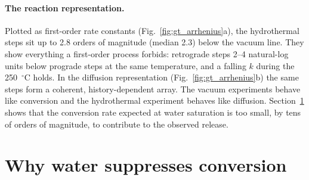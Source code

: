 \paragraph{The reaction representation.} Plotted as first-order rate constants
(Fig.~\ref{fig:gt_arrhenius}a), the hydrothermal steps sit up to 2.8 orders of magnitude
(median 2.3) below the vacuum line. They show everything a first-order process forbids:
retrograde steps 2--4 natural-log units below prograde steps at the same temperature, and a
falling $k$ during the 250~$^\circ$C holds. In the diffusion representation
(Fig.~\ref{fig:gt_arrhenius}b) the same steps form a coherent, history-dependent array. The vacuum
experiments behave like conversion and the hydrothermal experiment behaves like diffusion.
Section~\ref{sec:gt_nucleation} shows that the conversion rate expected at water saturation is too
small, by tens of orders of magnitude, to contribute to the observed release.


\section{Why water suppresses conversion}
\label{sec:gt_nucleation}

